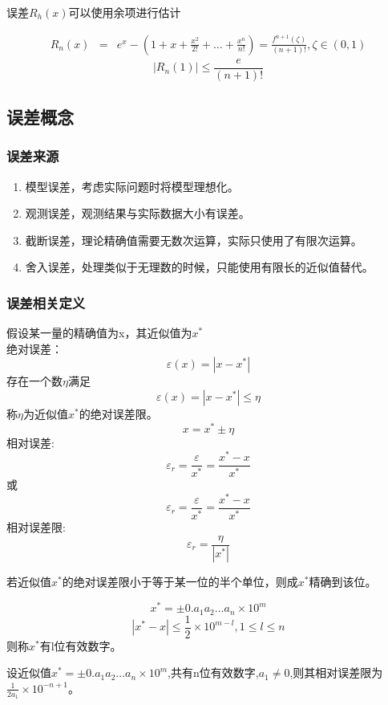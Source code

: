 \documentclass[12pt]{article}
\numberwithin{equation}{section}
\begin{document}
	误差$R_h(x)$可以使用余项进行估计  
	
	\begin{equation}
		\begin{aligned}
			R_n(x) &=& e^x - \left(1 + x + \frac{x^2}{2!} + \ldots + \frac{x^n}{n!}\right) = \frac{f^{n+1}(\zeta)}{(n+1)!}, \zeta \in \left(0, 1\right)
		\end{aligned}
	\end{equation}
	$$
	|R_n(1)| \leq \frac{e}{(n+1)!} 
	$$

	\subsection{误差概念}

	\subsubsection{误差来源}
	\begin{enumerate}
        \item 模型误差，考虑实际问题时将模型理想化。
        \item 观测误差，观测结果与实际数据大小有误差。
        \item 截断误差，理论精确值需要无数次运算，实际只使用了有限次运算。
        \item 舍入误差，处理类似于无理数的时候，只能使用有限长的近似值替代。
	\end{enumerate}

	\subsubsection{误差相关定义}
	假设某一量的精确值为x，其近似值为$x^*$  \\
	绝对误差：  
	$$
	\varepsilon (x) = |x - x^*|
	$$
	存在一个数$\eta$满足
	$$
	\varepsilon (x) = |x - x^*| \leq \eta
	$$
	称$\eta$为近似值$x^*$的绝对误差限。
	$$
	x = x^* \pm \eta
	$$
	相对误差:
	$$
	\varepsilon_r = \frac{\varepsilon}{x^*} = \frac{x^* - x}{x^*}
	$$
	或
	$$
	\varepsilon_r = \frac{\varepsilon}{x^*} = \frac{x^* - x}{x^*}
	$$
	相对误差限:
	$$
	\varepsilon_r = \frac{\eta}{|x^*|}
	$$  

	若近似值$x^*$的绝对误差限小于等于某一位的半个单位，则成$x^*$精确到该位。
	
	$$
	x^* = \pm 0.a_1 a_2 \ldots a_n \times 10^m
	$$
	$$
	|x^* - x| \leq \frac{1}{2} \times 10^{m-l}, 1\leq l \leq n
	$$
	则称$x^*$有l位有效数字。  

	设近似值$x^* = \pm 0.a_1 a_2 \ldots a_n \times 10^m$,共有n位有效数字,$a_1 \neq 0$,则其相对误差限为$\frac{1}{2a_1} \times 10^{-n+1}$。  
\end{document}

